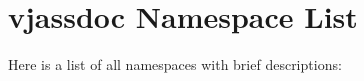 \section{vjassdoc Namespace List}
Here is a list of all namespaces with brief descriptions:\begin{CompactList}
\item{}
\end{CompactList}

